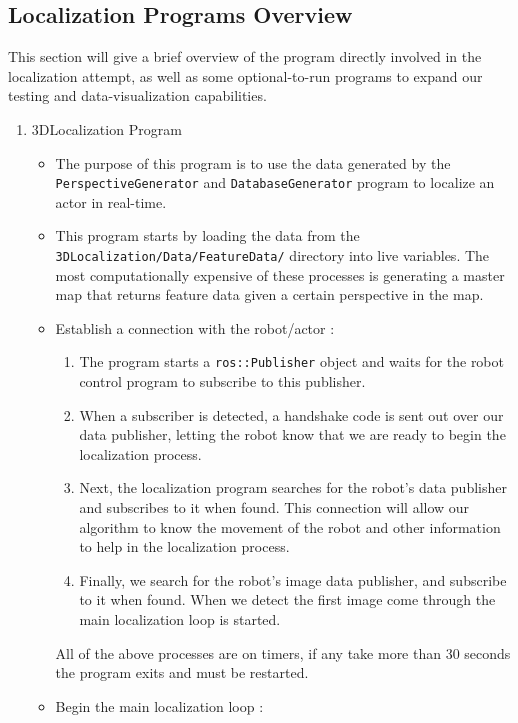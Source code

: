 \documentclass[a4paper,11pt]{article}
\begin{document}
        \subsection{Localization Programs Overview}
        This section will give a brief overview of the program directly involved in the localization attempt, as well as some optional-to-run programs to expand our testing and data-visualization capabilities.
        \begin{enumerate}
        \item 3DLocalization Program
            \begin{itemize}
            \item The purpose of this program is to use the data generated by the \texttt{PerspectiveGenerator} and \texttt{DatabaseGenerator} program to localize an actor in real-time. 
            \item This program starts by loading the data from the \texttt{3DLocalization/Data/FeatureData/} directory into live variables. The most computationally expensive of these processes is generating a master map that returns feature data given a certain perspective in the map.
            \item Establish a connection with the robot/actor :
              \begin{enumerate}
              \item The program starts a \texttt{ros::Publisher} object and waits for the robot control program to subscribe to this publisher.
              \item When a subscriber is detected, a handshake code is sent out over our data publisher, letting the robot know that we are ready to begin the localization process.
              \item Next, the localization program searches for the robot's data publisher and subscribes to it when found. This connection will allow our algorithm to know the movement of the robot and other information to help in the localization process.
              \item Finally, we search for the robot's image data publisher, and subscribe to it when found. When we detect the first image come through the main localization loop is started.
             \end{enumerate}
            All of the above processes are on timers, if any take more than 30 seconds the program exits and must be restarted. 
            \item Begin the main localization loop :

\end{itemize}
\end{enumerate}
\end{document}
